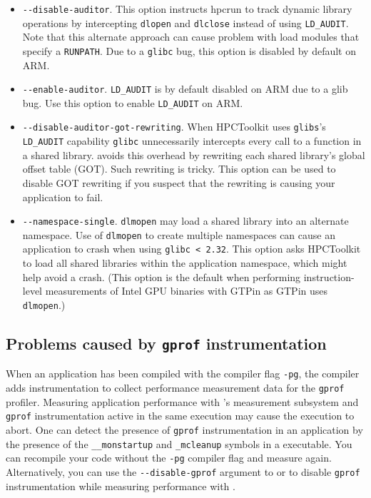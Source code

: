 \documentclass[11pt,twoside,letterpaper]{report}
\begin{document}
\begin{itemize}
\item\verb|--disable-auditor|. This option instructs hpcrun to track dynamic library operations by intercepting {\tt dlopen} and {\tt dlclose} instead of using {\tt LD\_AUDIT}.
 Note that this alternate approach can cause problem with load modules that specify a {\tt RUNPATH}.
 Due to a {\tt glibc} bug, this option is disabled by default on ARM.

\item\verb|--enable-auditor|. {\tt LD\_AUDIT} is by default disabled on ARM due to a glib bug. Use this option to enable {\tt LD\_AUDIT} on ARM.

\item\verb|--disable-auditor-got-rewriting|. When HPCToolkit uses  {\tt glibs}'s {\tt LD\_AUDIT}  capability {\tt glibc} unnecessarily intercepts every call to a function in a shared library.
\hpcrun{} avoids this overhead by rewriting each shared library's global offset table (GOT). Such rewriting is tricky. This option can be used to disable GOT rewriting if you suspect that the rewriting is causing your application to fail.

\item\verb|--namespace-single|.   {\tt dlmopen} may load a shared library into an alternate namespace.  Use of {\tt dlmopen} to create multiple namespaces can cause an application to crash when using \verb|glibc < 2.32|. This option asks HPCToolkit to load all  shared libraries within the application namespace, which might help avoid a crash.  (This option is the default when performing instruction-level measurements of Intel GPU binaries with GTPin as GTPin uses  {\tt dlmopen}.)
\end{itemize}


\subsection{Problems caused by {\tt gprof} instrumentation}

When an application has been compiled with the compiler flag \verb|-pg|,
the compiler adds instrumentation to collect performance measurement data for
the \verb|gprof| profiler. Measuring application performance with
\HPCToolkit{}'s measurement subsystem and \verb|gprof| instrumentation
active in the same execution may cause the execution
to abort. One can detect the presence of \verb|gprof| instrumentation in an
application by the presence of the \verb|__monstartup| and \verb|_mcleanup| symbols
in a executable.  You can recompile your code without the
\verb|-pg| compiler flag and measure again. Alternatively, you can use the \verb|--disable-gprof|
argument to \hpcrun{} or \hpclink{} to disable \verb|gprof| instrumentation while
measuring performance with \HPCToolkit{}.
\end{document}
